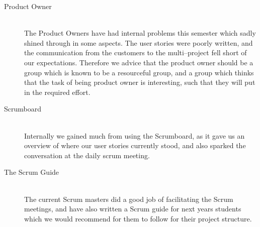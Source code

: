 \begin{description}
	\item[Product Owner] \hfill \\
	The Product Owners have had internal problems this semester which sadly shined through in some aspects.
	The user stories were poorly written, and the communication from the customers to the multi--project fell short of our expectations.
	Therefore we advice that the product owner should be a group which is known to be a resourceful group, and a group which thinks that the task of being product owner is interesting, such that they will put in the required effort.

	\item[Scrumboard] \hfill \\
	Internally we gained much from using the Scrumboard, as it gave us an overview of where our user stories currently stood, and also sparked the conversation at the daily scrum meeting. 

	\item[The Scrum Guide] \hfill \\
	The current Scrum masters did a good job of facilitating the Scrum meetings, and have also written a Scrum guide for next years students which we would recommend for them to follow for their project structure.
\end{description}
